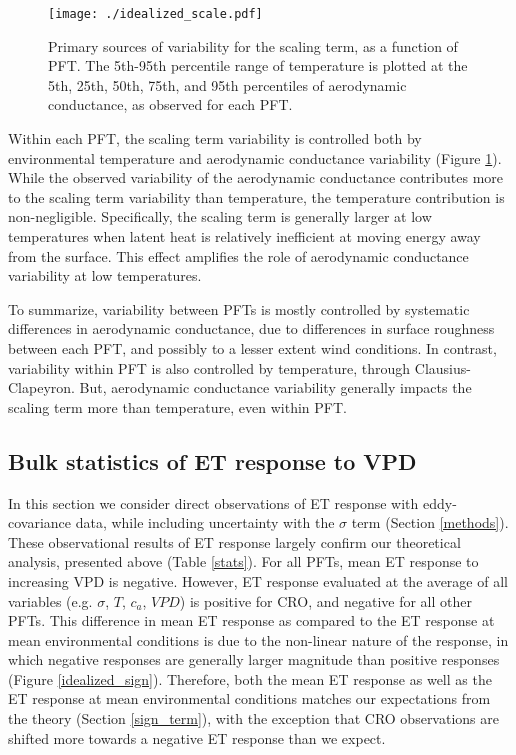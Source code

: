 \documentclass[draft,linenumbers]{agujournal}
\providecommand{\DIFaddbeginFL}{} %
\providecommand{\DIFaddendFL}{} %
\providecommand{\DIFdelbeginFL}{} %
\providecommand{\DIFdelendFL}{} %
\begin{document}
\begin{figure}
  \DIFdelbeginFL %
\DIFdelendFL %
  \DIFaddbeginFL \centerline{\texttt{[image: ./idealized\_scale.pdf]}}
  \DIFaddendFL \caption{Primary sources of variability for the scaling term, as a
    function of PFT. The 5th-95th percentile range of temperature is
    plotted at the 5th, 25th, 50th, 75th, and 95th percentiles of
    aerodynamic conductance, as observed for each PFT.}
  \label{scale_vary}
\end{figure}

Within each PFT, the scaling term variability is controlled both by
environmental temperature and aerodynamic conductance variability
(Figure \ref{scale_vary}). While the observed variability of the
aerodynamic conductance contributes more to the scaling term
variability than temperature, the temperature contribution is
non-negligible. Specifically, the scaling term is generally larger at
low temperatures when latent heat is relatively inefficient at moving
energy away from the surface. This effect amplifies the role of
aerodynamic conductance variability at low temperatures.

To summarize, variability between PFTs is mostly controlled by
systematic differences in aerodynamic conductance, due to differences
in surface roughness between each PFT, and possibly to a lesser extent
wind conditions. In contrast, variability within PFT is also
controlled by temperature, through Clausius-Clapeyron. But,
aerodynamic conductance variability generally impacts the scaling term
more than temperature, even within PFT.

\subsection{Bulk statistics of ET response to VPD}
\label{stats_sec}

In this section we consider direct observations of ET response with
eddy-covariance data, while including uncertainty with the $\sigma$
term (Section \ref{methods}). These observational results of ET
response largely confirm our theoretical analysis, presented above
(Table \ref{stats}). For all PFTs, mean ET response to increasing VPD
is negative. However, ET response evaluated at the average of all
variables (e.g. $\sigma$, $T$, $c_a$, $VPD$) is positive for CRO, and
negative for all other PFTs. This difference in mean ET response as
compared to the ET response at mean environmental conditions is due to
the non-linear nature of the response, in which negative responses are
generally larger magnitude than positive responses (Figure
\ref{idealized_sign}). Therefore, both the mean ET response as well as
the ET response at mean environmental conditions matches our
expectations from the theory (Section \ref{sign_term}), with the
exception that CRO observations are shifted more towards a negative ET
response than we expect.
\end{document}
